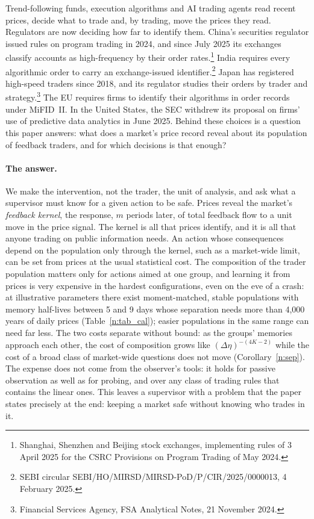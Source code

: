 \documentclass[12pt]{article}
\theoremstyle{definition}
\theoremstyle{remark}
\begin{document}
Trend-following funds, execution algorithms and AI trading agents read recent prices, decide what to trade and, by trading, move the prices they read. Regulators are now deciding how far to identify them. China's securities regulator issued rules on program trading in 2024, and since July 2025 its exchanges classify accounts as high-frequency by their order rates.\footnote{Shanghai, Shenzhen and Beijing stock exchanges, implementing rules of 3 April 2025 for the CSRC Provisions on Program Trading of May 2024.} India requires every algorithmic order to carry an exchange-issued identifier.\footnote{SEBI circular SEBI/HO/MIRSD/MIRSD-PoD/P/CIR/2025/0000013, 4 February 2025.} Japan has registered high-speed traders since 2018, and its regulator studies their orders by trader and strategy.\footnote{Financial Services Agency, FSA Analytical Notes, 21 November 2024.} The EU requires firms to identify their algorithms in order records under MiFID~II. In the United States, the SEC withdrew its proposal on firms' use of predictive data analytics in June 2025. Behind these choices is a question this paper answers: what does a market's price record reveal about its population of feedback traders, and for which decisions is that enough?

\paragraph{The answer.} We make the intervention, not the trader, the unit of analysis, and ask what a supervisor must know for a given action to be safe. Prices reveal the market's \emph{feedback kernel}, the response, $m$ periods later, of total feedback flow to a unit move in the price signal. The kernel is all that prices identify, and it is all that anyone trading on public information needs. An action whose consequences depend on the population only through the kernel, such as a market-wide limit, can be set from prices at the usual statistical cost. The composition of the trader population matters only for actions aimed at one group, and learning it from prices is very expensive in the hardest configurations, even on the eve of a crash: at illustrative parameters there exist moment-matched, stable populations with memory half-lives between 5 and 9 days whose separation needs more than 4{,}000 years of daily prices (Table~\ref{n:tab_cal}); easier populations in the same range can need far less. The two costs separate without bound: as the groups' memories approach each other, the cost of composition grows like $(\Delta\eta)^{-(4K-2)}$ while the cost of a broad class of market-wide questions does not move (Corollary~\ref{n:sep}). The expense does not come from the observer's tools: it holds for passive observation as well as for probing, and over any class of trading rules that contains the linear ones. This leaves a supervisor with a problem that the paper states precisely at the end: keeping a market safe without knowing who trades in it.
\end{document}
